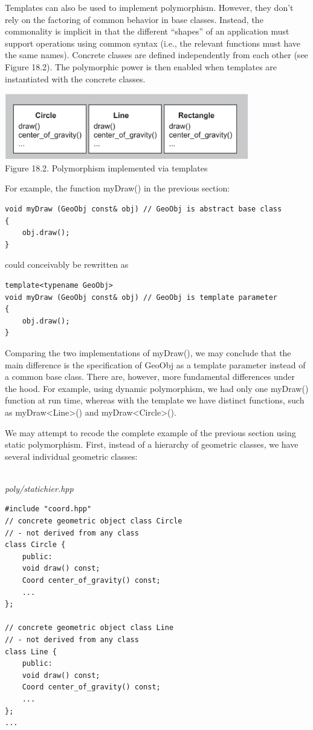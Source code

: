 
Templates can also be used to implement polymorphism. However, they don’t rely on the factoring of common behavior in base classes. Instead, the commonality is implicit in that the different “shapes” of an application must support operations using common syntax (i.e., the relevant functions must have the same names). Concrete classes are defined independently from each other (see Figure 18.2). The polymorphic power is then enabled when templates are instantiated with the concrete classes.

\begin{center}
\includegraphics[width=0.8\textwidth]{content/3/chapter18/images/2.png} \\
Figure 18.2. Polymorphism implemented via templates
\end{center}

For example, the function myDraw() in the previous section:

\begin{lstlisting}[style=styleCXX]
void myDraw (GeoObj const& obj) // GeoObj is abstract base class
{
	obj.draw();
}
\end{lstlisting}

could conceivably be rewritten as

\begin{lstlisting}[style=styleCXX]
template<typename GeoObj>
void myDraw (GeoObj const& obj) // GeoObj is template parameter
{
	obj.draw();
}
\end{lstlisting}

Comparing the two implementations of myDraw(), we may conclude that the main difference is the specification of GeoObj as a template parameter instead of a common base class. There are, however, more fundamental differences under the hood. For example, using dynamic polymorphism, we had only one myDraw() function at run time, whereas with the template we have distinct functions, such as myDraw<Line>() and myDraw<Circle>().

We may attempt to recode the complete example of the previous section using static polymorphism. First, instead of a hierarchy of geometric classes, we have several individual geometric classes:

\hspace*{\fill} \\ %
\noindent
\textit{poly/statichier.hpp}
\begin{lstlisting}[style=styleCXX]
#include "coord.hpp"
// concrete geometric object class Circle
// - not derived from any class
class Circle {
	public:
	void draw() const;
	Coord center_of_gravity() const;
	...
};

// concrete geometric object class Line
// - not derived from any class
class Line {
	public:
	void draw() const;
	Coord center_of_gravity() const;
	...
};
...
\end{lstlisting}

